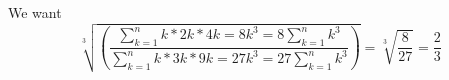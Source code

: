 We want $$\sqrt[3]{\left(\frac{\sum_{k=1}^{n}k*2k*4k=8k^3=8\sum_{k=1}^{n}k^3}{\sum_{k=1}^{n}k*3k*9k=27k^3=27\sum_{k=1}^{n}k^3}\right)}=\sqrt[3]{\frac{8}{27}}=\boxed{\frac{2}{3}}$$

